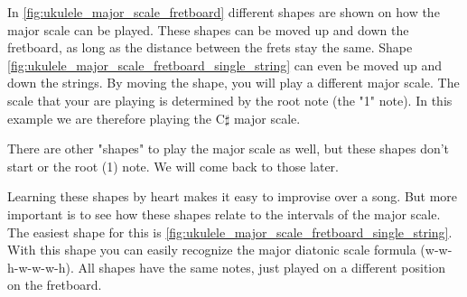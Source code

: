 \newpage

In \autoref{fig:ukulele_major_scale_fretboard} different shapes are shown on how the major scale can be played. These shapes can be moved up and down the fretboard, as long as the distance between the frets stay the same. Shape \autoref{fig:ukulele_major_scale_fretboard_single_string} can even be moved up and down the strings. By moving the shape, you will play a different major scale. The scale that your are playing is determined by the root note (the "1" note). In this example we are therefore playing the C$\sharp$ major scale.

There are other "shapes" to play the major scale as well, but these shapes don't start or the root (1) note. We will come back to those later.

Learning these shapes by heart makes it easy to improvise over a song. But more important is to see how these shapes relate to the intervals of the major scale. The easiest shape for this is \autoref{fig:ukulele_major_scale_fretboard_single_string}. With this shape you can easily recognize the major diatonic scale formula (w-w-h-w-w-w-h). All shapes have the same notes, just played on a different position on the fretboard.

